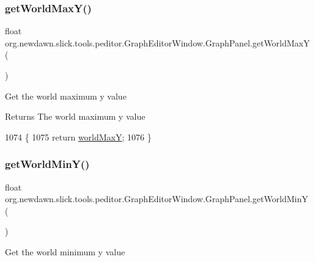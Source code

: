 \subsubsection{\texorpdfstring{get\+World\+Max\+Y()}{getWorldMaxY()}}
{\footnotesize\ttfamily float org.\+newdawn.\+slick.\+tools.\+peditor.\+Graph\+Editor\+Window.\+Graph\+Panel.\+get\+World\+MaxY (\begin{DoxyParamCaption}{ }\end{DoxyParamCaption})\hspace{0.3cm}{\ttfamily [inline]}}

Get the world maximum y value

\begin{DoxyReturn}{Returns}
The world maximum y value 
\end{DoxyReturn}

\begin{DoxyCode}
1074                                     \{
1075             \textcolor{keywordflow}{return} \mbox{\hyperlink{classorg_1_1newdawn_1_1slick_1_1tools_1_1peditor_1_1_graph_editor_window_1_1_graph_panel_a9b7733b23535ca22b1cbdb029587dcfe}{worldMaxY}};
1076         \}
\end{DoxyCode}
\mbox{\label{classorg_1_1newdawn_1_1slick_1_1tools_1_1peditor_1_1_graph_editor_window_1_1_graph_panel_af4dc37b1adfa8b6c5590a95fdd8703fb}} 
\subsubsection{\texorpdfstring{get\+World\+Min\+Y()}{getWorldMinY()}}
{\footnotesize\ttfamily float org.\+newdawn.\+slick.\+tools.\+peditor.\+Graph\+Editor\+Window.\+Graph\+Panel.\+get\+World\+MinY (\begin{DoxyParamCaption}{ }\end{DoxyParamCaption})\hspace{0.3cm}{\ttfamily [inline]}}

Get the world minimum y value

